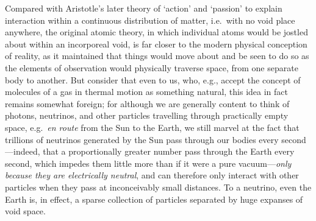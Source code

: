 Compared with Aristotle's later theory of `action' and `passion' to explain interaction within a continuous distribution of matter, i.e.~with no void place anywhere, the original atomic theory, in which individual atoms would be jostled about within an incorporeal void, is far closer to the modern physical conception of reality, as it maintained that things would move about and be seen to do so as the elements of observation would physically traverse space, from one separate body to another. But consider that even to us, who, e.g., accept the concept of molecules of a gas in thermal motion as something natural, this idea in fact remains somewhat foreign; for although we are generally content to think of photons, neutrinos, and other particles travelling through practically empty space, e.g.~\textit{en route} from the Sun to the Earth, we still marvel at the fact that trillions of neutrinos generated by the Sun pass through our bodies every second---indeed, that a proportionally greater number pass through the Earth every second, which impedes them little more than if it were a pure vacuum---\textit{only because they are electrically neutral}, and can therefore only interact with other particles when they pass at inconceivably small distances. To a neutrino, even the Earth is, in effect, a sparse collection of particles separated by huge expanses of void space. 

